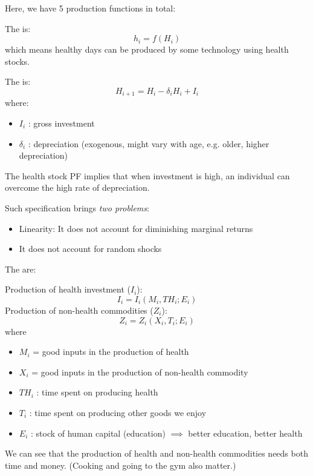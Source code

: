         Here, we have 5 production functions in total:

        The  is:
        \begin{equation*}
            h_i=f(H_i)
        \end{equation*}
        which means healthy days can be produced by some technology using health stocks.
        
        The  is:
        \begin{equation*}
            H_{i+1}=H_i-\delta_i H_i+I_i
        \end{equation*}
        where:
        \begin{itemize}
            \item $I_i$ : gross investment
            \item $\delta_i$ : depreciation (exogenous, might vary with age, e.g. older, higher depreciation)
        \end{itemize}
        The health stock PF implies that when investment is high, an individual can overcome the high rate of depreciation.

        Such specification brings \emph{two problems}:
        \begin{itemize}
            \item Linearity: It does not account for diminishing marginal returns
            \item It does not account for random shocks
        \end{itemize}

        The  are:

        Production of health investment ($I_i$):
        \begin{equation*}
            I_i=I_i(M_i,TH_i;E_i)
        \end{equation*}
        Production of non-health commodities ($Z_i$):
        \begin{equation*}
            Z_i=Z_i(X_i,T_i;E_i)
        \end{equation*}
        where
        \begin{itemize}
            \item $M_i$ = good inputs in the production of health
            \item $X_i$ = good inputs in the production of non-health commodity
            \item $TH_i$ : time spent on producing health
            \item $T_i$ : time spent on producing other goods we enjoy
            \item $E_i$ : stock of human capital (education) $\implies$ better education, better health
        \end{itemize}
        We can see that the production of health and non-health commodities needs both time and money. (Cooking and going to the gym also matter.) 

